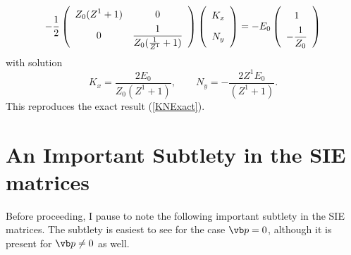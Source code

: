 \documentclass{article}
\begin{document}
$$ 
 -\frac{1}{2}
 \left(\begin{array}{cc}
 \displaystyle{ \vphantom{\frac{1}{Z_0}} Z_0(Z^1+1) } & 0 \\
 0 & \displaystyle{\frac{1}{Z_0(\frac{1}{Z^1} + 1)}}
 \end{array} \right)
 \left(\begin{array}{c}
 \displaystyle{ \vphantom{\frac{1}{Z_0}} K_x } 
 \\
 \displaystyle{ \vphantom{\frac{1}{Z_0}} N_y } 
 \end{array}\right)
=
 -E_0
 \left(\begin{array}{c}
 \displaystyle{ \vphantom{\frac{1}{Z_0}} 1 }
 \\
 \displaystyle{ -\frac{1}{Z_0} }
 \end{array}\right)
$$ 
with solution
$$ K_x = \frac{2E_0}{Z_0(Z^1+1)}, \qquad 
   N_y = -\frac{2 Z^1 E_0 }{(Z^1+1)}.
$$
This reproduces the exact result (\ref{KNExact}).

\newpage
\section{An Important Subtlety in the SIE matrices}

Before proceeding, I pause to note the following important subtlety
in the SIE matrices. The subtlety is easiest to see 
for the case $\vb p=0$, although it is present for $\vb p\ne 0$  
as well.
\end{document}
